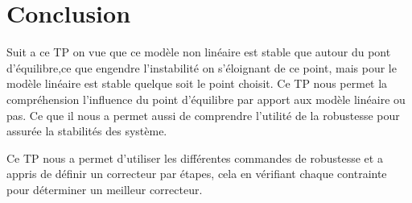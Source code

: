 \documentclass[12pt, a4paper, openany]{report}
\begin{document}
      
\chapter*{Conclusion}
      Suit a ce TP on vue que ce modèle non linéaire est stable que autour du pont d'équilibre,ce que engendre l'instabilité on s’éloignant de ce point, mais pour le modèle linéaire est stable quelque soit le point choisit.
      Ce TP nous permet la compréhension l’influence du point d’équilibre par apport aux modèle linéaire ou pas.
      Ce que il nous a permet aussi de comprendre l'utilité de la robustesse pour assurée la stabilités des système.   




Ce TP nous a permet d'utiliser les différentes commandes de robustesse et a appris de définir un correcteur par étapes, cela en vérifiant chaque contrainte pour déterminer un meilleur correcteur.\\










 







%
%
\end{document}
